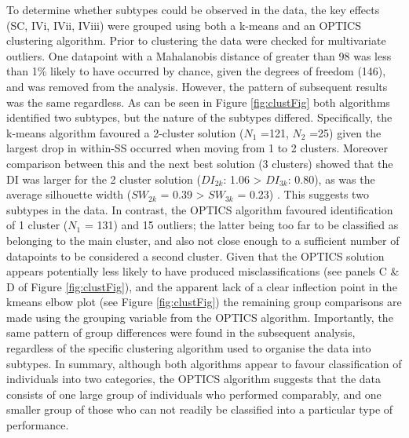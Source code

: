 \documentclass[11pt,halfline,a4paper,]{ouparticle}
\begin{document}
\label{sec:ClusAnalysis}

To determine whether subtypes could be observed in the data, the key effects (SC, IVi, IVii, IViii) were grouped using both a k-means and an OPTICS clustering algorithm. Prior to clustering the data were checked for multivariate outliers. One datapoint with a Mahalanobis distance of greater than 98 was less than 1\% likely to have occurred by chance, given the degrees of freedom (146), and was removed from the analysis. However, the pattern of subsequent results was the same regardless. As can be seen in Figure \ref{fig:clustFig} both algorithms identified two subtypes, but the nature of the subtypes differed. Specifically, the k-means algorithm favoured a 2-cluster solution (\(N_{1}\) =121, \(N_{2}\) =25) given the largest drop in within-SS occurred when moving from 1 to 2 clusters. Moreover comparison between this and the next best solution (3 clusters) showed that the DI was larger for the 2 cluster solution (\(DI_{2k}\): 1.06 \textgreater{} \(DI_{3k}\): 0.80), as was the average silhouette width (\(SW_{2k}\) = 0.39 \textgreater{} \(SW_{3k}\) = 0.23) . This suggests two subtypes in the data. In contrast, the OPTICS algorithm favoured identification of 1 cluster (\(N_{1}\) = 131) and 15 outliers; the latter being too far to be classified as belonging to the main cluster, and also not close enough to a sufficient number of datapoints to be considered a second cluster. Given that the OPTICS solution appears potentially less likely to have produced misclassifications (see panels C \& D of Figure \ref{fig:clustFig}), and the apparent lack of a clear inflection point in the kmeans elbow plot (see Figure \ref{fig:clustFig}) the remaining group comparisons are made using the grouping variable from the OPTICS algorithm. Importantly, the same pattern of group differences were found in the subsequent analysis, regardless of the specific clustering algorithm used to organise the data into subtypes. In summary, although both algorithms appear to favour classification of individuals into two categories, the OPTICS algorithm suggests that the data consists of one large group of individuals who performed comparably, and one smaller group of those who can not readily be classified into a particular type of performance.
\end{document}
